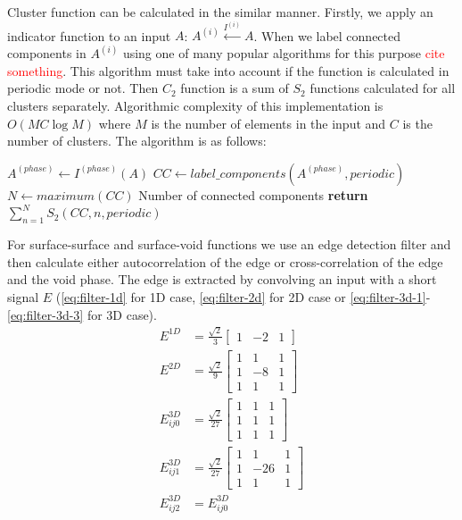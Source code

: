 \documentclass[reprint,amsmath,amssymb,aps,pre,showkeys,showpacs,nofootinbib]{revtex4-1}
\begin{document}
Cluster function can be calculated in the similar manner. Firstly, we apply an
indicator function to an input $A$: $A^{(i)} \xleftarrow{I^{(i)}} A$. When we
label connected components in $A^{(i)}$ using one of many popular algorithms for
this purpose \textcolor{red}{cite something}. This algorithm must take into
account if the function is calculated in periodic mode or not. Then $C_2$
function is a sum of $S_2$ functions calculated for all clusters
separately. Algorithmic complexity of this implementation is $O(MC \log M)$
where $M$ is the number of elements in the input and $C$ is the number of
clusters. The algorithm is as follows:
\begin{algorithmic}[1]
  \State $A^{(phase)} \gets I^{(phase)} (A)$
  \State $CC \gets label\_components(A^{(phase)}, periodic)$
  \State $N \gets maximum(CC)$ \Comment Number of connected components
  \State \textbf{return} $\sum\limits_{n=1}^N S_2(CC, n, periodic)$
  \EndProcedure
\end{algorithmic}

For surface-surface and surface-void functions we use an edge detection filter
and then calculate either autocorrelation of the edge or cross-correlation of
the edge and the void phase. The edge is extracted by convolving an input with a
short signal $E$ (\cref{eq:filter-1d} for 1D case, \cref{eq:filter-2d} for 2D case or
\cref{eq:filter-3d-1}-\cref{eq:filter-3d-3} for 3D case).
\begin{align}
  E^{1D} &= \frac{\sqrt{2}}{3} \left[
    \begin{array}{ccc}
        1 & -2 & 1
      \end{array}
    \right] \label{eq:filter-1d} \\
  E^{2D} &= \frac{\sqrt{2}}{9} \left[
    \begin{array}{ccc}
        1 & 1 & 1 \\
        1 & -8 & 1 \\
        1 & 1 & 1
      \end{array}
    \right] \label{eq:filter-2d} \\
  E^{3D}_{ij0} &= \frac{\sqrt{2}}{27} \left[
    \begin{array}{ccc}
        1 & 1 & 1 \\
        1 & 1 & 1 \\
        1 & 1 & 1
    \end{array}
    \right] \label{eq:filter-3d-1} \\
  E^{3D}_{ij1} &= \frac{\sqrt{2}}{27} \left[
    \begin{array}{ccc}
      1 & 1 & 1 \\
      1 & -26 & 1 \\
      1 & 1 & 1
    \end{array}
    \right] \label{eq:filter-3d-2} \\
  E^{3D}_{ij2} &= E^{3D}_{ij0} \label{eq:filter-3d-3}
\end{align}
\end{document}
